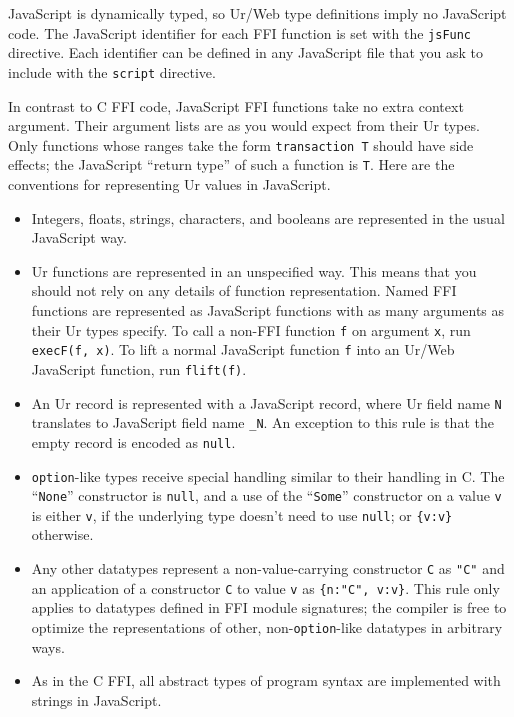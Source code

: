 \documentclass{article}
\newcommand{\cd}[1]{\texttt{#1}}
\begin{document}
JavaScript is dynamically typed, so Ur/Web type definitions imply no JavaScript code.  The JavaScript identifier for each FFI function is set with the \texttt{jsFunc} directive.  Each identifier can be defined in any JavaScript file that you ask to include with the \texttt{script} directive.

In contrast to C FFI code, JavaScript FFI functions take no extra context argument.  Their argument lists are as you would expect from their Ur types.  Only functions whose ranges take the form \texttt{transaction T} should have side effects; the JavaScript ``return type'' of such a function is \texttt{T}.  Here are the conventions for representing Ur values in JavaScript.

\begin{itemize}
\item Integers, floats, strings, characters, and booleans are represented in the usual JavaScript way.
\item Ur functions are represented in an unspecified way.  This means that you should not rely on any details of function representation.  Named FFI functions are represented as JavaScript functions with as many arguments as their Ur types specify.  To call a non-FFI function \texttt{f} on argument \texttt{x}, run \texttt{execF(f, x)}.  To lift a normal JavaScript function \cd{f} into an Ur/Web JavaScript function, run \cd{flift(f)}.
\item An Ur record is represented with a JavaScript record, where Ur field name \texttt{N} translates to JavaScript field name \texttt{\_N}.  An exception to this rule is that the empty record is encoded as \texttt{null}.
\item \texttt{option}-like types receive special handling similar to their handling in C.  The ``\texttt{None}'' constructor is \texttt{null}, and a use of the ``\texttt{Some}'' constructor on a value \texttt{v} is either \texttt{v}, if the underlying type doesn't need to use \texttt{null}; or \texttt{\{v:v\}} otherwise.
\item Any other datatypes represent a non-value-carrying constructor \texttt{C} as \texttt{"C"} and an application of a constructor \texttt{C} to value \texttt{v} as \texttt{\{n:"C", v:v\}}.  This rule only applies to datatypes defined in FFI module signatures; the compiler is free to optimize the representations of other, non-\texttt{option}-like datatypes in arbitrary ways.
\item As in the C FFI, all abstract types of program syntax are implemented with strings in JavaScript.
\end{itemize}
\end{document}

